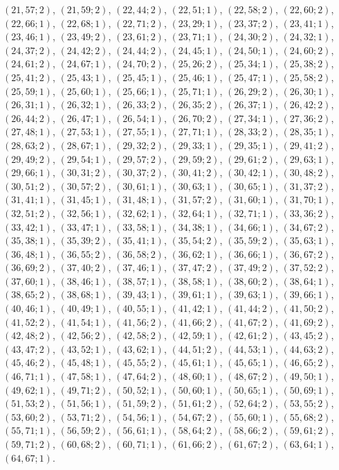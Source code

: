 \documentclass[11pt]{article}
\begin{document}
$(21,57;2)$, $(21,59;2)$, $(22,44;2)$, $(22,51;1)$, $(22,58;2)$, $(22,60;2)$, $(22,66;1)$, $(22,68;1)$, $(22,71;2)$, $(23,29;1)$, $(23,37;2)$, $(23,41;1)$, $(23,46;1)$, $(23,49;2)$, $(23,61;2)$, $(23,71;1)$, $(24,30;2)$, $(24,32;1)$, $(24,37;2)$, $(24,42;2)$, $(24,44;2)$, $(24,45;1)$, $(24,50;1)$, $(24,60;2)$, $(24,61;2)$, $(24,67;1)$, $(24,70;2)$, $(25,26;2)$, $(25,34;1)$, $(25,38;2)$, $(25,41;2)$, $(25,43;1)$, $(25,45;1)$, $(25,46;1)$, $(25,47;1)$, $(25,58;2)$, $(25,59;1)$, $(25,60;1)$, $(25,66;1)$, $(25,71;1)$, $(26,29;2)$, $(26,30;1)$, $(26,31;1)$, $(26,32;1)$, $(26,33;2)$, $(26,35;2)$, $(26,37;1)$, $(26,42;2)$, $(26,44;2)$, $(26,47;1)$, $(26,54;1)$, $(26,70;2)$, $(27,34;1)$, $(27,36;2)$, $(27,48;1)$, $(27,53;1)$, $(27,55;1)$, $(27,71;1)$, $(28,33;2)$, $(28,35;1)$, $(28,63;2)$, $(28,67;1)$, $(29,32;2)$, $(29,33;1)$, $(29,35;1)$, $(29,41;2)$, $(29,49;2)$, $(29,54;1)$, $(29,57;2)$, $(29,59;2)$, $(29,61;2)$, $(29,63;1)$, $(29,66;1)$, $(30,31;2)$, $(30,37;2)$, $(30,41;2)$, $(30,42;1)$, $(30,48;2)$, $(30,51;2)$, $(30,57;2)$, $(30,61;1)$, $(30,63;1)$, $(30,65;1)$, $(31,37;2)$, $(31,41;1)$, $(31,45;1)$, $(31,48;1)$, $(31,57;2)$, $(31,60;1)$, $(31,70;1)$, $(32,51;2)$, $(32,56;1)$, $(32,62;1)$, $(32,64;1)$, $(32,71;1)$, $(33,36;2)$, $(33,42;1)$, $(33,47;1)$, $(33,58;1)$, $(34,38;1)$, $(34,66;1)$, $(34,67;2)$, $(35,38;1)$, $(35,39;2)$, $(35,41;1)$, $(35,54;2)$, $(35,59;2)$, $(35,63;1)$, $(36,48;1)$, $(36,55;2)$, $(36,58;2)$, $(36,62;1)$, $(36,66;1)$, $(36,67;2)$, $(36,69;2)$, $(37,40;2)$, $(37,46;1)$, $(37,47;2)$, $(37,49;2)$, $(37,52;2)$, $(37,60;1)$, $(38,46;1)$, $(38,57;1)$, $(38,58;1)$, $(38,60;2)$, $(38,64;1)$, $(38,65;2)$, $(38,68;1)$, $(39,43;1)$, $(39,61;1)$, $(39,63;1)$, $(39,66;1)$, $(40,46;1)$, $(40,49;1)$, $(40,55;1)$, $(41,42;1)$, $(41,44;2)$, $(41,50;2)$, $(41,52;2)$, $(41,54;1)$, $(41,56;2)$, $(41,66;2)$, $(41,67;2)$, $(41,69;2)$, $(42,48;2)$, $(42,56;2)$, $(42,58;2)$, $(42,59;1)$, $(42,61;2)$, $(43,45;2)$, $(43,47;2)$, $(43,52;1)$, $(43,62;1)$, $(44,51;2)$, $(44,53;1)$, $(44,63;2)$, $(45,46;2)$, $(45,48;1)$, $(45,55;2)$, $(45,61;1)$, $(45,65;1)$, $(46,65;2)$, $(46,71;1)$, $(47,58;1)$, $(47,64;2)$, $(48,60;1)$, $(48,67;2)$, $(49,50;1)$, $(49,62;1)$, $(49,71;2)$, $(50,52;1)$, $(50,60;1)$, $(50,65;1)$, $(50,69;1)$, $(51,53;2)$, $(51,56;1)$, $(51,59;2)$, $(51,61;2)$, $(52,64;2)$, $(53,55;2)$, $(53,60;2)$, $(53,71;2)$, $(54,56;1)$, $(54,67;2)$, $(55,60;1)$, $(55,68;2)$, $(55,71;1)$, $(56,59;2)$, $(56,61;1)$, $(58,64;2)$, $(58,66;2)$, $(59,61;2)$, $(59,71;2)$, $(60,68;2)$, $(60,71;1)$, $(61,66;2)$, $(61,67;2)$, $(63,64;1)$, $(64,67;1)$.
\end{document}
